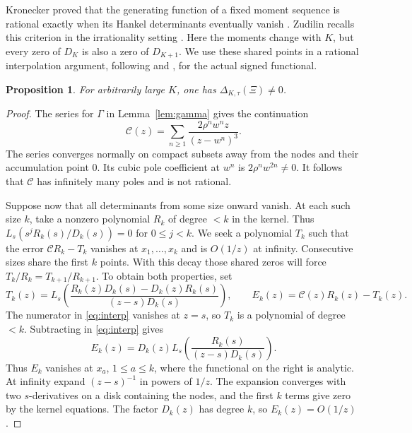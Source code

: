 \documentclass[11pt,letterpaper]{article}
\newtheorem{proposition}[theorem]{Proposition}
\numberwithin{equation}{section}
\begin{document}
Kronecker proved that the generating function of a fixed moment sequence
is rational exactly when its Hankel determinants eventually vanish
\cite[Arts.~VII and~IX]{Kronecker}. Zudilin recalls this criterion in
the irrationality setting \cite[Section~5]{Zudilin}. Here the moments
change with \(K\), but every zero of \(D_K\) is also a zero of \(D_{K+1}\).
We use these shared points in a
rational interpolation argument, following \cite[Proposition~5.1]{QZeta}
and \cite[Proposition~6.1]{KLucas}, for the actual signed functional.

\begin{proposition}\label{prop:nonzero}
For arbitrarily large \(K\), one has \(\Delta_{K,\tau}(\Xi)\ne0\).
\end{proposition}
\begin{proof}
The series for \(\Gamma\) in Lemma~\ref{lem:gamma} gives the continuation
\[
 \mathcal C(z)=\sum_{n\ge1}\frac{2\rho^n w^n z}{(z-w^n)^3}.
\]
The series converges normally on compact subsets away from the nodes
and their accumulation point \(0\). Its cubic pole coefficient at
\(w^n\) is \(2\rho^n w^{2n}\ne0\). It follows that \(\mathcal C\)
has infinitely many poles and is not rational.

Suppose now that all determinants from some size onward vanish.
At each such size \(k\), take a nonzero polynomial \(R_k\) of
degree \(<k\) in the kernel. Thus
\(L_s(s^jR_k(s)/D_k(s))=0\) for \(0\le j<k\).
We seek a polynomial \(T_k\) such that the error
\(\mathcal C R_k-T_k\) vanishes at \(x_1,\ldots,x_k\) and is
\(O(1/z)\) at infinity. Consecutive sizes share the first \(k\)
points. With this decay those shared zeros will force
\(T_k/R_k=T_{k+1}/R_{k+1}\). To obtain both properties, set
\begin{equation}\label{eq:interp}
 T_k(z)=L_s\!\left(
   \frac{R_k(z)D_k(s)-D_k(z)R_k(s)}{(z-s)D_k(s)}
                      \right),\qquad
 E_k(z)=\mathcal C(z)R_k(z)-T_k(z).
\end{equation}
The numerator in \eqref{eq:interp} vanishes at \(z=s\), so \(T_k\)
is a polynomial of degree \(<k\). Subtracting in \eqref{eq:interp}
gives
\[
 E_k(z)=D_k(z)L_s\!\left(\frac{R_k(s)}{(z-s)D_k(s)}\right).
\]
Thus \(E_k\) vanishes at \(x_a\), \(1\le a\le k\),
where the functional on the right is analytic. At infinity expand
\((z-s)^{-1}\) in powers of \(1/z\). The expansion converges with
two \(s\)-derivatives on a disk containing the nodes, and the first
\(k\) terms give zero by the kernel equations. The factor \(D_k(z)\)
has degree \(k\), so \(E_k(z)=O(1/z)\).


\end{proof}
\end{document}
